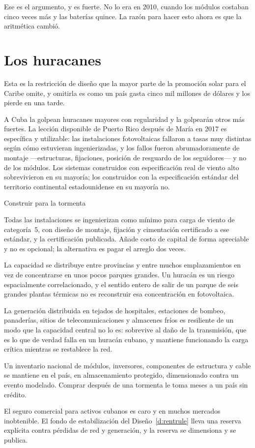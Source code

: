 Ese es el argumento, y es fuerte. No lo era en 2010, cuando los módulos costaban cinco
veces más y las baterías quince. La razón para hacer esto ahora es que la aritmética
cambió.

\section{Los huracanes}

Esta es la restricción de diseño que la mayor parte de la promoción solar para el Caribe
omite, y omitirla es como un país gasta cinco mil millones de dólares y los pierde en una
tarde.

A Cuba la golpean huracanes mayores con regularidad y la golpearán otros más fuertes. La
lección disponible de Puerto Rico después de María en 2017 es específica y utilizable:
las instalaciones fotovoltaicas fallaron a tasas muy distintas según cómo estuvieran
ingenierizadas, y los fallos fueron abrumadoramente de montaje ---estructuras,
fijaciones, posición de resguardo de los seguidores--- y no de los módulos. Los sistemas
construidos con especificación real de viento alto sobrevivieron en su mayoría; los
construidos con la especificación estándar del territorio continental estadounidense en
su mayoría no.

\begin{design}{Construir para la tormenta}
\label{d:storm}
\begin{rules}
 Todas las instalaciones se ingenierizan como mínimo para carga de
viento de categoría~5, con diseño de montaje, fijación y cimentación certificado a ese
estándar, y la certificación publicada. Añade costo de capital de forma apreciable y no
es opcional; la alternativa es pagar el arreglo dos veces.

 La capacidad se distribuye entre provincias y entre muchos
emplazamientos en vez de concentrarse en unos pocos parques grandes. Un huracán es un
riesgo espacialmente correlacionado, y el sentido entero de salir de un parque de seis
grandes plantas térmicas no es reconstruir esa concentración en fotovoltaica.

 La generación distribuida en tejados de hospitales,
estaciones de bombeo, panaderías, sitios de telecomunicaciones y almacenes fríos es
resiliente de un modo que la capacidad central no lo es: sobrevive al daño de la
transmisión, que es lo que de verdad falla en un huracán cubano, y mantiene funcionando
la carga crítica mientras se restablece la red.

 Un inventario nacional de módulos, inversores,
componentes de estructura y cable se mantiene en el país, en almacenamiento protegido,
dimensionado contra un evento modelado. Comprar después de una tormenta le toma meses a
un país sin crédito.

 El seguro comercial para activos cubanos es caro y en muchos mercados
inobtenible. El fondo de estabilización del Diseño~\ref{d:rentrule} lleva una reserva
explícita contra pérdidas de red y generación, y la reserva se dimensiona y se publica.
\end{rules}
\end{design}

